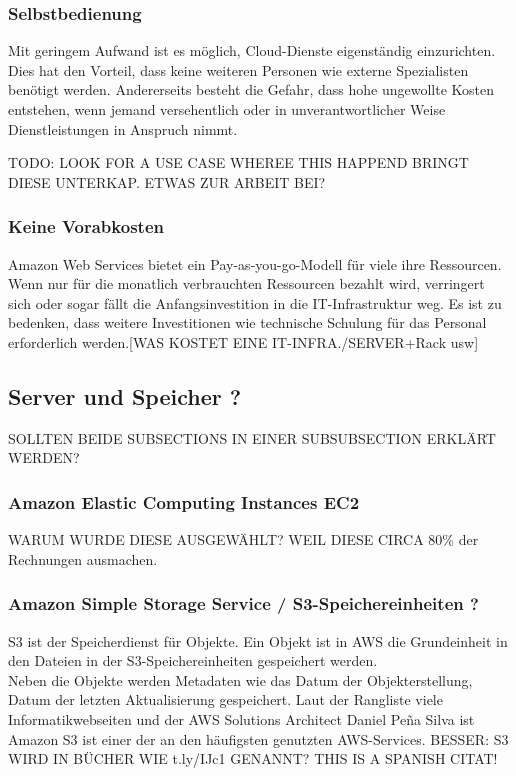 \subsubsection{Selbstbedienung}
Mit geringem Aufwand ist es möglich, Cloud-Dienste eigenständig einzurichten. Dies hat den Vorteil, dass keine weiteren Personen wie externe Spezialisten benötigt werden.
Andererseits besteht die Gefahr, dass hohe ungewollte Kosten entstehen, wenn jemand versehentlich oder in unverantwortlicher Weise Dienstleistungen in Anspruch nimmt.

TODO: LOOK FOR A USE CASE WHEREE THIS HAPPEND
BRINGT DIESE UNTERKAP. ETWAS ZUR ARBEIT BEI?


\subsubsection{Keine Vorabkosten}
Amazon Web Services bietet ein Pay-as-you-go-Modell für viele ihre Ressourcen. %
Wenn nur für die monatlich verbrauchten Ressourcen bezahlt wird, verringert sich oder sogar fällt die Anfangsinvestition in die IT-Infrastruktur weg. Es ist zu bedenken, dass weitere Investitionen wie technische Schulung für das Personal erforderlich werden.[WAS KOSTET EINE IT-INFRA./SERVER+Rack usw]


\subsection{Server und Speicher ?}
SOLLTEN BEIDE SUBSECTIONS IN EINER SUBSUBSECTION ERKLÄRT WERDEN?
\subsubsection{Amazon Elastic Computing Instances EC2 }
WARUM WURDE DIESE AUSGEWÄHLT? WEIL DIESE CIRCA 80\% der Rechnungen ausmachen.
\subsubsection{Amazon Simple Storage Service / S3-Speichereinheiten ?}
S3 ist der Speicherdienst für Objekte. Ein Objekt ist in AWS die Grundeinheit in den Dateien in der S3-Speichereinheiten gespeichert werden.
\\
Neben die Objekte werden Metadaten wie das Datum der Objekterstellung, Datum der letzten Aktualisierung gespeichert.
Laut der Rangliste viele Informatikwebseiten und der AWS Solutions Architect Daniel Peña Silva{\cite{STA1}} ist Amazon S3 ist einer der an den häufigsten genutzten AWS-Services. BESSER: S3 WIRD IN BÜCHER WIE t.ly/IJc1 GENANNT? THIS IS A SPANISH CITAT!

